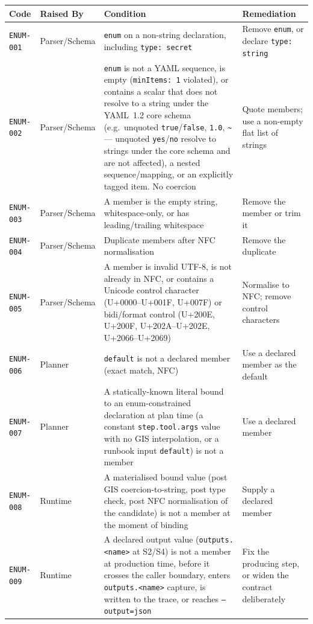 \begin{center}\small
\begin{tabular}{p{2.3cm}p{1.9cm}p{6.3cm}p{3.6cm}}
\hline
\textbf{Code} & \textbf{Raised By} & \textbf{Condition} & \textbf{Remediation} \\
\hline
\texttt{ENUM-001} & Parser/Schema & \texttt{enum} on a non-string declaration, including \texttt{type: secret} & Remove \texttt{enum}, or declare \texttt{type: string} \\
\texttt{ENUM-002} & Parser/Schema & \texttt{enum} is not a YAML sequence, is empty (\texttt{minItems: 1} violated), or contains a scalar that does not resolve to a string under the YAML~1.2 core schema (e.g.\ unquoted \texttt{true}/\texttt{false}, \texttt{1.0}, \texttt{\textasciitilde} --- unquoted \texttt{yes}/\texttt{no} resolve to strings under the core schema and are not affected), a nested sequence/mapping, or an explicitly tagged item. No coercion & Quote members; use a non-empty flat list of strings \\
\texttt{ENUM-003} & Parser/Schema & A member is the empty string, whitespace-only, or has leading/trailing whitespace & Remove the member or trim it \\
\texttt{ENUM-004} & Parser/Schema & Duplicate members after NFC normalisation & Remove the duplicate \\
\texttt{ENUM-005} & Parser/Schema & A member is invalid UTF-8, is not already in NFC, or contains a Unicode control character (U+0000--U+001F, U+007F) or bidi/format control (U+200E, U+200F, U+202A--U+202E, U+2066--U+2069) & Normalise to NFC; remove control characters \\
\texttt{ENUM-006} & Planner & \texttt{default} is not a declared member (exact match, NFC) & Use a declared member as the default \\
\texttt{ENUM-007} & Planner & A statically-known literal bound to an enum-constrained declaration at plan time (a constant \texttt{step.tool.args} value with no GIS interpolation, or a runbook input \texttt{default}) is not a member & Use a declared member \\
\texttt{ENUM-008} & Runtime & A materialised bound value (post GIS coercion-to-string, post type check, post NFC normalisation of the candidate) is not a member at the moment of binding & Supply a declared member \\
\texttt{ENUM-009} & Runtime & A declared output value (\texttt{outputs.<name>} at S2/S4) is not a member at production time, before it crosses the caller boundary, enters \texttt{outputs.<name>} capture, is written to the trace, or reaches \texttt{--output=json} & Fix the producing step, or widen the contract deliberately \\
\hline
\end{tabular}
\end{center}

